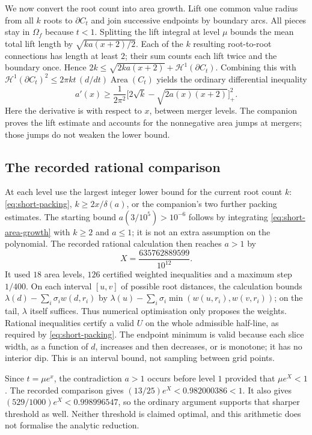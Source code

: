 \documentclass[11pt]{article}
\begin{document}
We now convert the root count into area growth. Lift one common value
radius from all $k$ roots to $\partial C_t$ and join successive endpoints
by boundary arcs. All pieces stay in $\Omega_f$ because $t<1$.
Splitting the lift integral at level $\mu$ bounds the mean total lift
length by $\sqrt{ka(x+2)/2}$. Each of the $k$ resulting root-to-root
connections has length at least $2$; their sum counts each lift twice
and the boundary once. Hence
$2k\le\sqrt{2ka(x+2)}+\mathcal H^1(\partial C_t)$.
Combining this with
$\mathcal H^1(\partial C_t)^2\le2\pi k t\,(d/dt)\operatorname{Area}(C_t)$
yields the ordinary differential inequality
\begin{equation}\label{eq:short-area-growth}
 a'(x)\ge\frac1{2\pi^2}
       \bigl[2\sqrt k-\sqrt{2a(x)(x+2)}\bigr]_+^2.
\end{equation}
Here the derivative is with respect to $x$, between merger levels.
The companion proves the lift estimate and accounts for the nonnegative
area jumps at mergers; those jumps do not weaken the lower bound.

\subsection{The recorded rational comparison}
\hypertarget{certificate-stopping-time}{}
At each level use the largest integer lower bound for the current root
count $k$: \eqref{eq:short-packing}, $k\ge2x/\delta(a)$, or the
companion's two further packing estimates. The starting bound
$a(3/10^5)>10^{-6}$ follows by integrating
\eqref{eq:short-area-growth} with $k\ge2$ and $a\le1$; it is not an
extra assumption on the polynomial. The recorded rational calculation
then reaches $a>1$ by
\[
 X=\frac{635762889599}{10^{12}}.
\]
It used $18$ area levels, $126$ certified weighted inequalities and a
maximum step $1/400$. On each interval $[u,v]$ of possible root distances, the calculation
bounds $\lambda(d)-\sum_i\sigma_iw(d,r_i)$ by
$\lambda(u)-\sum_i\sigma_i\min(w(u,r_i),w(v,r_i))$; on the tail,
$\lambda$ itself suffices. Thus numerical optimisation only proposes
the weights. Rational inequalities certify a valid $U$ on the whole
admissible half-line, as required by \eqref{eq:short-packing}.
The endpoint minimum is valid because each slice width, as a function
of $d$, increases and then decreases, or is monotone; it has no interior
dip. This is an interval bound, not sampling between grid points.

Since $t=\mu e^x$, the contradiction $a>1$ occurs before level $1$
provided that $\mu e^X<1$. The recorded comparison gives
$(13/25)e^X<0.982000386<1$. It also gives
$(529/1000)e^X<0.998996547$, so the ordinary argument supports that
sharper threshold as well. Neither threshold is claimed
optimal, and this arithmetic does not formalise the analytic reduction.
\end{document}
